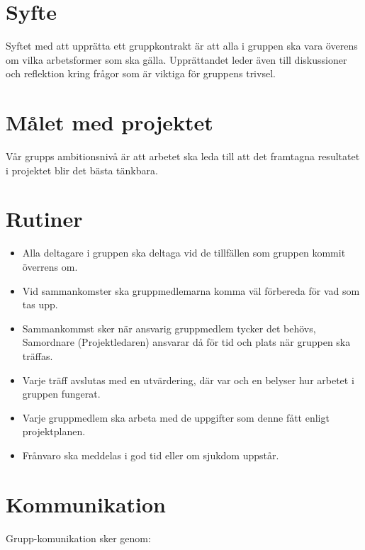 \documentclass[11pt]{article}
\begin{document}
\begin{flushleft}
\section{Syfte}
Syftet med att upprätta ett gruppkontrakt är att alla i gruppen ska vara överens om vilka arbetsformer som ska gälla. Upprättandet leder även till diskussioner och reflektion kring frågor som är viktiga för gruppens trivsel.

\section{Målet med projektet}
Vår grupps ambitionsnivå är att arbetet ska leda till att det framtagna resultatet i projektet blir det bästa tänkbara.


\section{Rutiner}

\begin{itemize}
  \item Alla deltagare i gruppen ska deltaga vid de tillfällen som gruppen kommit överrens om.
  
  \item Vid sammankomster ska gruppmedlemarna komma väl förbereda för vad som tas upp.
  
  \item Sammankommst sker när ansvarig gruppmedlem tycker det behövs, Samordnare (Projektledaren) ansvarar då för tid och plats när gruppen ska träffas.
  
\item Varje träff avslutas med en utvärdering, där var och en belyser hur arbetet i gruppen fungerat.  
  
  \item Varje gruppmedlem ska arbeta med de uppgifter som denne fått enligt projektplanen.
  
  \item Frånvaro ska meddelas i god tid eller om sjukdom uppstår.
  
  
\end{itemize}


\section{Kommunikation}
Grupp-komunikation sker genom:
\begin{itemize}


\end{itemize}
\end{flushleft}
\end{document}
